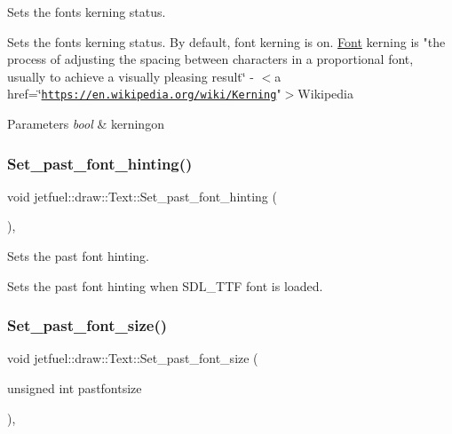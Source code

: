 Sets the font\textquotesingle{}s kerning status. 

Sets the font\textquotesingle{}s kerning status. By default, font kerning is on. \hyperlink{classjetfuel_1_1draw_1_1Font}{Font} kerning is "the process of adjusting the spacing between characters in a proportional font, usually to achieve a visually pleasing result\char`\"{}
-\/ $<$a href=\char`\"{}\href{https://en.wikipedia.org/wiki/Kerning}{\tt https\+://en.\+wikipedia.\+org/wiki/\+Kerning}"$>$Wikipedia


\begin{DoxyParams}{Parameters}
{\em bool} & kerningon \\
\hline
\end{DoxyParams}
\mbox{\label{classjetfuel_1_1draw_1_1Text_af867aba4f3951b99bc23f3bf8d7cf201}} 
\subsubsection{\texorpdfstring{Set\+\_\+past\+\_\+font\+\_\+hinting()}{Set\_past\_font\_hinting()}}
{\footnotesize\ttfamily void jetfuel\+::draw\+::\+Text\+::\+Set\+\_\+past\+\_\+font\+\_\+hinting (\begin{DoxyParamCaption}{ }\end{DoxyParamCaption})\hspace{0.3cm}{\ttfamily [inline]}, {\ttfamily [protected]}}



Sets the past font hinting. 

Sets the past font hinting when S\+D\+L\+\_\+\+T\+TF font is loaded. \mbox{\label{classjetfuel_1_1draw_1_1Text_a1d4519c1b6366a1be4a5168eadffd818}} 
\subsubsection{\texorpdfstring{Set\+\_\+past\+\_\+font\+\_\+size()}{Set\_past\_font\_size()}}
{\footnotesize\ttfamily void jetfuel\+::draw\+::\+Text\+::\+Set\+\_\+past\+\_\+font\+\_\+size (\begin{DoxyParamCaption}\item[{unsigned int}]{pastfontsize }\end{DoxyParamCaption})\hspace{0.3cm}{\ttfamily [inline]}, {\ttfamily [protected]}}



